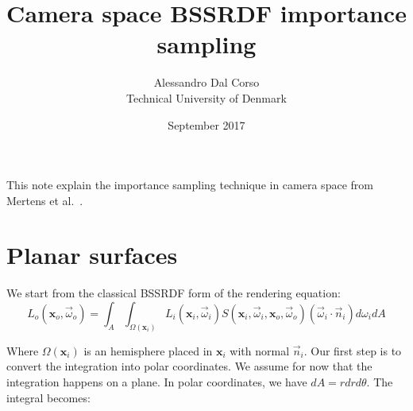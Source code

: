 \documentclass[10pt,a4paper]{article}
\title{Camera space BSSRDF importance sampling}
\date{September 2017}
\author{Alessandro Dal Corso \\ Technical University of Denmark
}
\begin{document}
\maketitle
\newcommand{\vecfunc}[2] {\vec{#1}(\mathbf{#2})}
\newcommand{\func}[2] {{#1}(\mathbf{#2})}
\newcommand{\omegafunc}[2] {{#1}(\mathbf{#2}, \vec{\omega})}

\newcommand{\xvecfunc}[1] {\vecfunc{#1}{x}}
\newcommand{\xfunc}[1] {\func{#1}{x}}
\newcommand{\xomegafunc}[1] {\omegafunc{#1}{x}}
\newcommand{\nablavec} {{\nabla}}
\newcommand{\omegavec} {\vec{\omega}}
\newcommand{\sphere}[2] {\int_{4\pi}{#1}\ d{\ifthenelse{\isempty{#2}{}}{{\omega}}{#2}}}
\newcommand{\hemisphere}[2] {\int_{2\pi_+}{#1}\ d{\ifthenelse{\isempty{#2}{}}{{\omega}}{#2}}}
\newcommand{\inwardhemisphere}[2] {\int_{2\pi_-}{#1}\ d{\ifthenelse{\isempty{#2}{}}{{\omega}}{#2}}}

\newcommand{\absorption}{\sigma_a}
\newcommand{\transmission}{\sigma_{tr}}
\newcommand{\scattering}{\sigma_s}
\newcommand{\extinction}{\sigma_t}
\newcommand{\fluence}{G_0}
\newcommand{\flux}{\mathbf{G}_1}
\newcommand{\sourcezero}[1]{\func{q}{#1}}
\newcommand{\sourcezerox}{\xfunc{q}}
\newcommand{\sourceone}[1]{\vec{\mathbf{Q}}(\mathbf{#1}, \omegavec)}
\newcommand{\sourceonex}{\vec{\mathbf{Q}}(\mathbf{x}, \omegavec)}
\newcommand{\redsca}{{\sigma}'_s}
\newcommand{\redext}{{\sigma}'_t}
\newcommand{\redscaEddington}{\tilde{\sigma}_s}
\newcommand{\redextEddington}{\tilde{\sigma}_t}
\newcommand{\de}{\text{d}}
\newcommand{\cphi}{C_{\phi}}
\newcommand{\cE}{C_{\mathbf{E}}}
\newcommand{\nvec} {\vec{n}}
\newcommand{\radius} {r}

This note explain the importance sampling technique in camera space from Mertens et al.~\cite{Mertens2003}.

\section{Planar surfaces}
We start from the classical BSSRDF form of the rendering equation:
\begin{equation*}
L_o(\mathbf{x}_o, \omegavec_o) = \int_A \int_{\Omega(\mathbf{x}_i)} L_i(\mathbf{x}_i, \omegavec_i) S(\mathbf{x}_i, \omegavec_i, \mathbf{x}_o, \omegavec_o) (\omegavec_i \cdot \nvec_i) d\omega_i dA
\end{equation*}

Where $\Omega(\mathbf{x}_i)$ is an hemisphere placed in $\mathbf{x}_i$ with normal $\nvec_i$.
Our first step is to convert the integration into polar coordinates. We assume for now that the integration happens on a plane. In polar coordinates, we have $dA = r dr d\theta$. The integral becomes:
\end{document}
